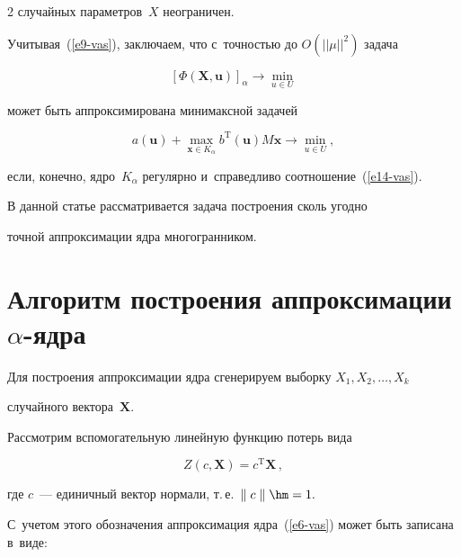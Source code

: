 \begin{multicols}{2}
случайных па\-ра\-мет\-ров~$X$ неограничен.



Учитывая~(\ref{e9-vas}), заключаем, что с~точ\-ностью до $O(||\mu||^2)$ задача

\begin{equation*}

[\Phi(\mathbf {X},\mathbf {u})]_\alpha\to \min\limits_{u\in U}


\end{equation*}

может быть аппроксимирована минимаксной задачей

\begin{equation*}

a(\mathbf {u})+\max\limits_{\mathbf {x}\in K_\alpha} b^{\mathrm{T}}

(\mathbf {u}) M \mathbf {x} \to \min\limits_{u\in U},


\end{equation*}

если, конечно, ядро~$K_\alpha$ регулярно и~справедливо соотношение~(\ref{e14-vas}).



В данной статье рассматривается задача построения сколь угодно 

точ\-ной аппроксимации ядра многогранником.



\section{Алгоритм построения аппроксимации $\alpha$-ядра}



Для построения аппроксимации ядра сгенерируем выборку $X_1, X_2, \ldots, X_k$ 

случайного вектора~$\mathbf {X}.$

Рас\-смот\-рим вспомогательную линейную функцию потерь вида

$$

Z(c,\mathbf {X})=c^{\mathrm {T}} \mathbf{X}\,,

$$

где $c$~--- единичный вектор нормали, т.\,е.\ \mbox{$\parallel c\parallel \hm= 1.$}

С~учетом этого обозначения аппроксимация ядра~(\ref{e6-vas}) может быть записана в~виде:

\begin{equation*}


\end{equation*}
\end{multicols}
